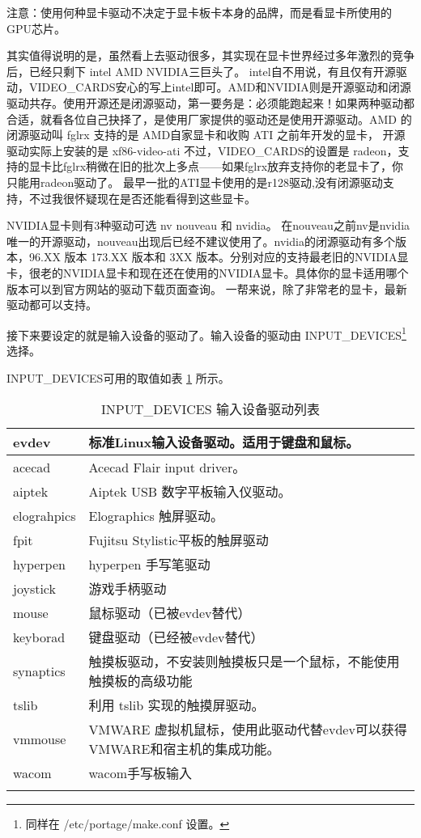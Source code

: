 \begin{insertnote}
注意：使用何种显卡驱动不决定于显卡板卡本身的品牌，而是看显卡所使用的GPU芯片。
\end{insertnote}


其实值得说明的是，虽然看上去驱动很多，其实现在显卡世界经过多年激烈的竞争后，已经只剩下 intel AMD NVIDIA三巨头了。
intel自不用说，有且仅有开源驱动，VIDEO\_CARDS安心的写上intel即可。AMD和NVIDIA则是开源驱动和闭源驱动共存。使用开源还是闭源驱动，第一要务是：必须能跑起来！如果两种驱动都合适，就看各位自己抉择了，是使用厂家提供的驱动还是使用开源驱动。AMD 的闭源驱动叫 fglrx 支持的是 AMD自家显卡和收购 ATI 之前年开发的显卡， 开源驱动实际上安装的是 xf86-video-ati 不过，VIDEO\_CARDS的设置是 radeon，支持的显卡比fglrx稍微在旧的批次上多点——如果fglrx放弃支持你的老显卡了，你只能用radeon驱动了。 最早一批的ATI显卡使用的是r128驱动,没有闭源驱动支持，不过我很怀疑现在是否还能看得到这些显卡。

NVIDIA显卡则有3种驱动可选 nv nouveau 和 nvidia。 在nouveau之前nv是nvidia唯一的开源驱动，nouveau出现后已经不建议使用了。nvidia的闭源驱动有多个版本，96.XX 版本 173.XX 版本和 3XX 版本。分别对应的支持最老旧的NVIDIA显卡，很老的NVIDIA显卡和现在还在使用的NVIDIA显卡。具体你的显卡适用哪个版本可以到官方网站的驱动下载页面查询。
一帮来说，除了非常老的显卡，最新驱动都可以支持。

接下来要设定的就是输入设备的驱动了。输入设备的驱动由 INPUT\_DEVICES\footnote{同样在 /etc/portage/make.conf 设置。} 选择。

INPUT\_DEVICES可用的取值如表 \ref{table:inputdevice} 所示。


\begin{longtable}{|l|p{}|}
\caption{INPUT\_DEVICES 输入设备驱动列表}\label{table:inputdevice}\\\hline
evdev & 标准Linux输入设备驱动。适用于键盘和鼠标。 \\\hline
acecad & Acecad Flair input driver。  \\\hline
aiptek & Aiptek  USB 数字平板输入仪驱动。 \\\hline
elograhpics & Elographics 触屏驱动。\\\hline
fpit & Fujitsu Stylistic平板的触屏驱动 \\\hline
hyperpen & hyperpen 手写笔驱动 \\\hline
joystick & 游戏手柄驱动 \\\hline
mouse & 鼠标驱动（已被evdev替代） \\\hline
keyborad & 键盘驱动（已经被evdev替代）\\\hline
synaptics & 触摸板驱动，不安装则触摸板只是一个鼠标，不能使用触摸板的高级功能 \\\hline
tslib & 利用 tslib 实现的触摸屏驱动。 \\\hline
vmmouse & VMWARE 虚拟机鼠标，使用此驱动代替evdev可以获得VMWARE和宿主机的集成功能。\\\hline
wacom & wacom手写板输入 \\\hline

\caption{INPUT\_DEVICES 输入设备驱动列表}
\end{longtable}


